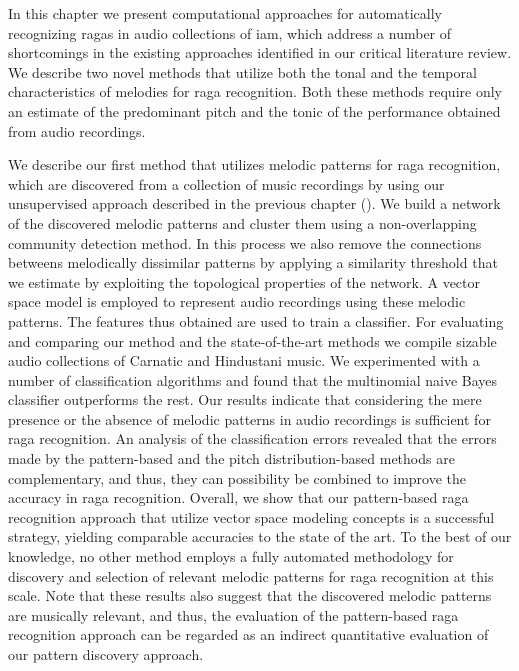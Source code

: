 In this chapter we present computational approaches for automatically recognizing \glspl{raga} in audio collections of \gls{iam}, which address a number of shortcomings in the existing approaches identified in our critical literature review. We describe two novel methods that utilize both the tonal and the temporal characteristics of melodies for \gls{raga} recognition. Both these methods require only an estimate of the predominant pitch and the tonic of the performance obtained from audio recordings.

We describe our first method that utilizes melodic patterns for \gls{raga} recognition, which are discovered from a collection of music recordings by using our unsupervised approach described in the previous chapter (). We build a network of the discovered melodic patterns and cluster them using a non-overlapping community detection method. In this process we also remove the connections betweens melodically dissimilar patterns by applying a similarity threshold that we estimate by exploiting the topological properties of the network. A vector space model is employed to represent audio recordings using these melodic patterns. The features thus obtained are used to train a classifier. For evaluating and comparing our method and the state-of-the-art methods we compile sizable audio collections of Carnatic and Hindustani music. We experimented with a number of classification algorithms and found that the multinomial naive Bayes classifier outperforms the rest. Our results indicate that considering the mere presence or the absence of melodic patterns in audio recordings is sufficient for \gls{raga} recognition. An analysis of the classification errors revealed that the errors made by the pattern-based and the pitch distribution-based methods are complementary, and thus, they can possibility be combined to improve the accuracy in \gls{raga} recognition. Overall, we show that our pattern-based \gls{raga} recognition approach that utilize vector space modeling concepts is a successful strategy, yielding comparable accuracies to the state of the art. To the best of our knowledge, no other method employs a fully automated methodology for discovery and selection of relevant melodic patterns for \gls{raga} recognition at this scale. Note that these results also suggest that the discovered melodic patterns are musically relevant, and thus, the evaluation of the pattern-based \gls{raga} recognition approach can be regarded as an indirect quantitative evaluation of our pattern discovery approach. 

